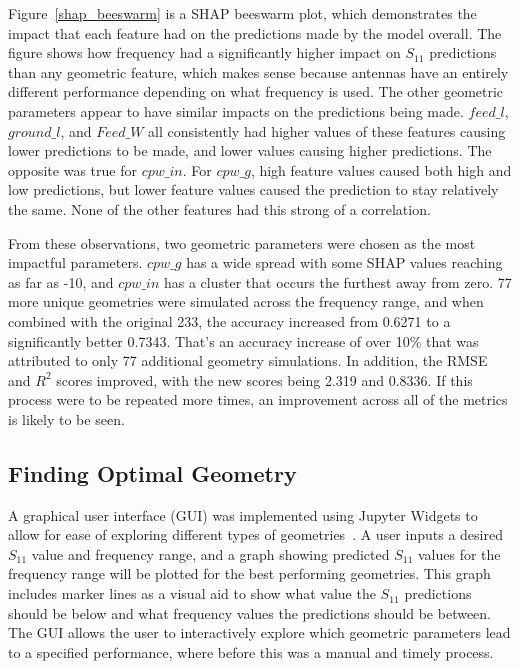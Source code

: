 \documentclass[conference]{IEEEtran}
\begin{document}
Figure~\ref{shap_beeswarm} is a SHAP beeswarm plot, which demonstrates the impact that each feature had on the predictions made by the model overall. The figure shows how frequency had a significantly higher impact on $S_{11}$ predictions than any geometric feature, which makes sense because antennas have an entirely different performance depending on what frequency is used. The other geometric parameters appear to have similar impacts on the predictions being made. $feed\_l$, $ground\_l$, and $Feed\_W$ all consistently had higher values of these features causing lower predictions to be made, and lower values causing higher predictions. The opposite was true for $cpw\_in$. For $cpw\_g$, high feature values caused both high and low predictions, but lower feature values caused the prediction to stay relatively the same. None of the other features had this strong of a correlation. 

From these observations, two geometric parameters were chosen as the most impactful parameters. $cpw\_g$ has a wide spread with some SHAP values reaching as far as -10, and $cpw\_in$ has a cluster that occurs the furthest away from zero. 77 more unique geometries were simulated across the frequency range, and when combined with the original 233, the accuracy increased from 0.6271 to a significantly better 0.7343. That's an accuracy increase of over 10\% that was attributed to only 77 additional geometry simulations. In addition, the RMSE and $R^2$ scores improved, with the new scores being 2.319 and 0.8336. If this process were to be repeated more times, an improvement across all of the metrics is likely to be seen. 


\subsection{Finding Optimal Geometry}
A graphical user interface (GUI) was implemented using Jupyter Widgets to allow for ease of exploring different types of geometries~\cite{interactive_Jupyter_widgets}. A user inputs a desired $S_{11}$ value and frequency range, and a graph showing predicted $S_{11}$ values for the frequency range will be plotted for the best performing geometries. This graph includes marker lines as a visual aid to show what value the $S_{11}$ predictions should be below and what frequency values the predictions should be between. The GUI allows the user to interactively explore which geometric parameters lead to a specified performance, where before this was a manual and timely process.  
\end{document}
